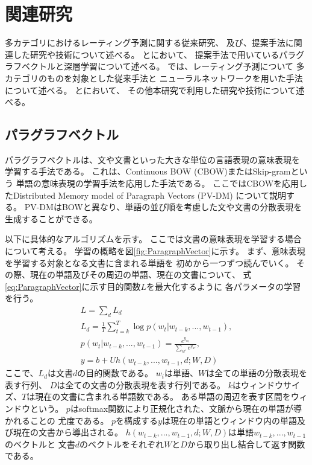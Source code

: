 \section{関連研究} \label{sec:RelatedResearch}

多カテゴリにおけるレーティング予測に関する従来研究、
及び、提案手法に関連した研究や技術について述べる。
とにおいて、
提案手法で用いているパラグラフベクトルと深層学習について述べる。
では、レーティング予測について
多カテゴリのものを対象とした従来手法と
ニューラルネットワークを用いた手法について述べる。
とにおいて、
その他本研究で利用した研究や技術について述べる。


\subsection{パラグラフベクトル} \label{ssec:ParagraphVector}

パラグラフベクトルは、文や文書といった大きな単位の言語表現の意味表現を
学習する手法である。
これは、Continuous BOW (CBOW)またはSkip-gram\cite{yoshua03}という
単語の意味表現の学習手法を応用した手法である。
ここではCBOWを応用したDistributed Memory model of Paragraph Vectors (PV-DM)
について説明する。
PV-DMはBOWと異なり、単語の並び順を考慮した文や文書の分散表現を
生成することができる。

以下に具体的なアルゴリズムを示す。
ここでは文書の意味表現を学習する場合について考える。
学習の概略を図\ref{fig:ParagraphVector}に示す。
まず、意味表現を学習する対象となる文書に含まれる単語を
初めから一つずつ読んでいく。
その際、現在の単語及びその周辺の単語、現在の文書について、
式\ref{eq:ParagraphVector}に示す目的関数$L$を最大化するように
各パラメータの学習を行う。
\begin{gather} \label{eq:ParagraphVector}
  L = \sum_d L_d \\
  L_d = \frac{1}{T} \sum^{T}_{t = k} \log p(w_t | w_{t-k}, ..., w_{t-1}),
     \nonumber \\
  p(w_t | w_{t-k}, ..., w_{t-1}) = \frac{e^{y_{w_t}}}{\sum_{w'} e^{y_{w'}}},
    \nonumber \\
  y = b + Uh(w_{t-k}, ..., w_{t-1}, d; W, D) \nonumber
\end{gather}
ここで、$L_d$は文書$d$の目的関数である。
$w_i$は単語、$W$は全ての単語の分散表現を表す行列、
$D$は全ての文書の分散表現を表す行列である。
$k$はウィンドウサイズ、$T$は現在の文書に含まれる単語数である。
ある単語の周辺を表す区間をウィンドウという。
$p$はsoftmax関数により正規化された、文脈から現在の単語が導かれることの
尤度である。
$p$を構成する$y$は現在の単語とウィンドウ内の単語及び現在の文書から導出される。
$h(w_{t-k}, ..., w_{t-1}, d; W, D)$は単語$w_{t-k}, ..., w_{t-1}$のベクトルと
文書$d$のベクトルをそれぞれ$W$と$D$から取り出し結合して返す関数である。

